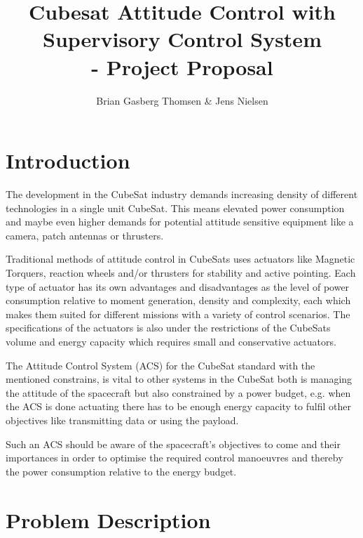 \documentclass[10pt,a4paper,oneside,openany,article]{memoir}
\title{\vspace{-2cm} Cubesat Attitude Control with Supervisory Control System \\ \Large - Project Proposal}
\author{Brian Gasberg Thomsen \& Jens Nielsen}
\begin{document}
\maketitle

\chapter{Introduction}
The development in the CubeSat industry demands increasing density of different technologies in a single unit CubeSat. This means elevated power consumption and maybe even higher demands for potential attitude sensitive equipment like a camera, patch antennas or thrusters. 

Traditional methods of attitude control in CubeSats uses actuators like Magnetic Torquers, reaction wheels and/or thrusters for stability and active pointing. Each type of actuator has its own advantages and disadvantages as the level of power consumption relative to moment generation, density and complexity, each which makes them suited for different missions with a variety of control scenarios. The specifications of the actuators is also under the restrictions of the CubeSats volume and energy capacity which requires small and conservative actuators.

The Attitude Control System (ACS) for the CubeSat standard with the mentioned constrains, is vital to other systems in the CubeSat both is managing the attitude of the spacecraft but also constrained by a power budget, e.g. when the ACS is done actuating there has to be enough energy capacity to fulfil other objectives like transmitting data or using the payload.

Such an ACS should be aware of the spacecraft's objectives to come and their importances in order to optimise the required control manoeuvres and thereby the power consumption relative to the energy budget.

\chapter{Problem Description}

\end{document}
